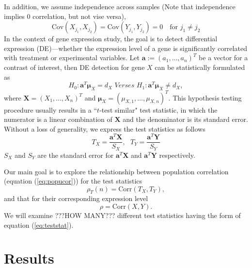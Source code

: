 \documentclass[12pt, a4paper]{article}
\newcommand{\cov}{\text{Cov}}
\newcommand{\cor}{\text{Corr}}
\begin{document}
	In addition, we assume independence across samples (Note that independence implies 0 correlation, but not vise versa), 
	\begin{equation}\label{eq:indepsamples}
	\cov(X_{j_1}, X_{j_2}) = \cov(Y_{j_1}, Y_{j_2}) = 0 \text{~~~for $j_1\neq j_2$}
	\end{equation}
	 In the context of gene expression study, the goal is to detect differential expression (DE)---whether the expression level of a gene is 
	 significantly correlated with treatment or experimental variables. Let $\bm a:=(a_1, \ldots, a_n)^T$ be a vector for a contrast of 
	 interest, then DE detection for gene $X$ can be statistically formulated as 
	 \begin{equation}\label{eq:hypotheses}
	 H_{0}:  \bm a^T\bm \mu_X = d_X \textit{     Verses   }  H_{1}: \bm a^T\bm \mu_X \neq d_X,
	 \end{equation}
	 where $\bm X = (X_1, \ldots, X_n)^T$ and $\bm \mu_{X} = (\mu_{X, 1}, \ldots, \mu_{X, n})^T$. 
	This hypothesis testing procedure usually results in a ``$t$-test similar" test statistic, in which the numerator is a linear combination of 
	$\bm X$ and the denominator is its standard error. Without a loss of generality, we express the test statistics as follows
	\begin{equation}\label{eq:teststat}
	T_X = \dfrac{\bm a^T\bm X}{S_X},  ~~~ T_Y = \dfrac{\bm a^T \bm Y}{S_Y}
	\end{equation}  
	$S_X$ and $S_Y$ are the standard error for $\bm a^T\bm X$ and $\bm a^T\bm Y$ respectively.
	
	Our main goal is to explore the relationship between population correlation (equation (\ref{eq:popucor})) for the test statistics 
	\begin{equation}
	\rho_T(n) = \cor({T_X, T_Y}),
	\end{equation}  
	and that for their corresponding expression level 
	\begin{equation}
	\rho = \cor(X, Y). 
	\end{equation}
	We will examine ???HOW MANY??? different test statistics having the form of equation (\ref{eq:teststat}).%
		

	
	\section{Results}\label{section:tcorresults}
	
\end{document}
